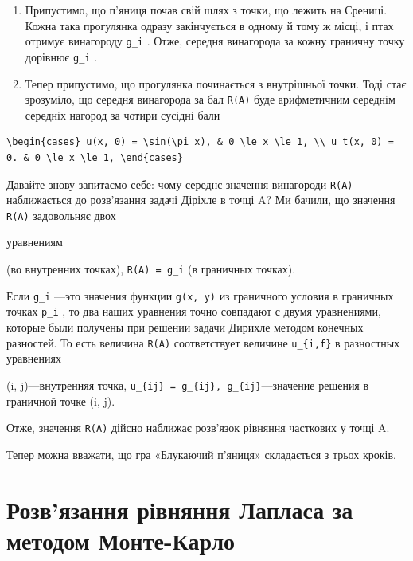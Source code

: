 \documentclass[
  ukrainian,
]{article}
\begin{document}
\begin{enumerate}
\def\labelenumi{\arabic{enumi}.}
\item
  Припустимо, що п'яниця почав свій шлях з точки, що лежить на Єрениці.
  Кожна така прогулянка одразу закінчується в одному й тому ж місці, і
  птах отримує винагороду \texttt{g\_i} . Отже, середня винагорода за
  кожну граничну точку дорівнює \texttt{g\_i} .
\item
  Тепер припустимо, що прогулянка починається з внутрішньої точки. Тоді
  стає зрозуміло, що середня винагорода за бал \texttt{R(A)} буде
  арифметичним середнім середніх нагород за чотири сусідні бали
\end{enumerate}

\begin{verbatim}
\begin{cases} u(x, 0) = \sin(\pi x), & 0 \le x \le 1, \\ u_t(x, 0) = 0. & 0 \le x \le 1, \end{cases}
\end{verbatim}

Давайте знову запитаємо себе: чому середнє значення винагороди
\texttt{R(A)} наближається до розв'язання задачі Діріхле в точці A? Ми
бачили, що значення \texttt{R(A)} задовольняє двох

уравнениям

(во внутренних точках), \texttt{R(A)\ =\ g\_i} (в граничных точках).

Если \texttt{g\_i} ---это значения функции \texttt{g(x,\ y)} из
граничного условия в граничных точках \texttt{p\_i} , то два наших
уравнения точно совпадают с двумя уравнениями, которые были получены при
решении задачи Дирихле методом конечных разностей. То есть величина
\texttt{R(A)} соответствует величине \texttt{u\_\{i,f\}} в разностных
уравнениях

(i, j)---внутренняя точка,
\texttt{u\_\{ij\}\ =\ g\_\{ij\},\ g\_\{ij\}}---значение решения в
граничной точке (i, j).

Отже, значення \texttt{R(A)} дійсно наближає розв'язок рівняння
часткових у точці A.

Тепер можна вважати, що гра «Блукаючий п'яниця» складається з трьох
кроків.

\section{Розв'язання рівняння Лапласа за методом
Монте-Карло}\label{ux440ux43eux437ux432ux44fux437ux430ux43dux43dux44f-ux440ux456ux432ux43dux44fux43dux43dux44f-ux43bux430ux43fux43bux430ux441ux430-ux437ux430-ux43cux435ux442ux43eux434ux43eux43c-ux43cux43eux43dux442ux435-ux43aux430ux440ux43bux43e}
\end{document}

